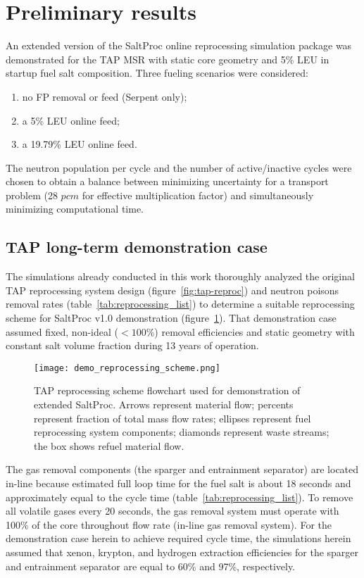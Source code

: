\section{Preliminary results} \label{sec:stage2-demo}
An extended version of the SaltProc online reprocessing simulation package was
demonstrated for the \gls{TAP} \gls{MSR} with static core geometry and 5\% 
\gls{LEU} in startup fuel salt composition. Three fueling
scenarios 
were considered: 
\begin{enumerate}[label=(\alph*)]
	\item no \gls{FP} removal or feed (Serpent only);
	\item a 5\% \gls{LEU} online feed;
	\item a 19.79\% \gls{LEU} online feed. 
\end{enumerate}
The neutron population per cycle and the number of active/inactive cycles
were chosen to obtain a balance between minimizing uncertainty for a transport 
problem (28 $pcm$ for effective multiplication factor) and simultaneously 
minimizing computational time. 
\subsection{TAP long-term demonstration case} 
The simulations already conducted in this work thoroughly analyzed the 
original \gls{TAP} reprocessing system design (figure~\ref{fig:tap-reproc}) 
and neutron poisons removal rates  (table~\ref{tab:reprocessing_list}) to 
determine a suitable reprocessing scheme for SaltProc v1.0 demonstration 
(figure~\ref{fig:demo-repro-scheme}). That demonstration case assumed fixed, 
non-ideal ($<100$\%) removal efficiencies and static geometry with constant 
salt volume fraction during 13 years of operation.
\begin{figure}[htp!] %
	\centering
	\texttt{[image: demo\_reprocessing\_scheme.png]}
	\caption{\gls{TAP} reprocessing scheme flowchart used for demonstration of 
	extended SaltProc. Arrows represent material flow; percents represent 
	fraction of total mass flow rates; ellipses represent fuel reprocessing 
		system components; diamonds represent waste streams; the box shows 
		refuel material flow.}
	\label{fig:demo-repro-scheme}
\end{figure}

The gas removal components (the sparger and entrainment separator) are located 
in-line because estimated full loop time for the fuel salt is about 18 seconds 
and approximately equal to the cycle time (table~\ref{tab:reprocessing_list}). 
To remove all volatile gases every 20 seconds, the gas removal system must 
operate with 100\% of the core throughout flow rate (in-line gas removal 
system). For the demonstration case herein to achieve required cycle time, the 
simulations herein assumed that xenon, krypton, and hydrogen extraction 
efficiencies for the sparger and entrainment separator are equal to 60\% and 
97\%, respectively.

